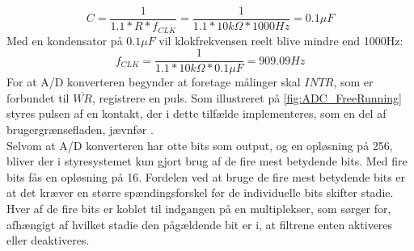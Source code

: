 %
\begin{equation}
	C = \frac{1}{1.1*R*f_{CLK}} = \frac{1}{1.1*10k\Omega*1000Hz} = 0.1\mu F
\end{equation}
%
Med en kondensator på $0.1\mu F$ vil klokfrekvensen reelt blive mindre end 1000Hz:
%
\begin{equation}
	f_{CLK} = \frac{1}{1.1*10k\Omega*0.1\mu F} = 909.09Hz
\end{equation}
%
For at A/D konverteren begynder at foretage målinger skal $\overline{INTR}$, som er forbundet til $\overline{WR}$, registrere en puls. Som illustreret på \autoref{fig:ADC_FreeRunning} styres pulsen af en kontakt, der i dette tilfælde implementeres, som en del af brugergrænsefladen, jævnfør . \\[5mm]
%
Selvom at A/D konverteren har otte bits som output, og en opløsning på 256, bliver der i styresystemet kun gjort brug af de fire mest betydende bits. Med fire bits fås en opløsning på 16. Fordelen ved at bruge de fire mest betydende bits er at det kræver en større spændingsforskel før de individuelle bits skifter stadie. Hver af de fire bits er koblet til indgangen på en multiplekser, som sørger for, afhængigt af hvilket stadie den pågældende bit er i, at filtrene enten aktiveres eller deaktiveres. 

